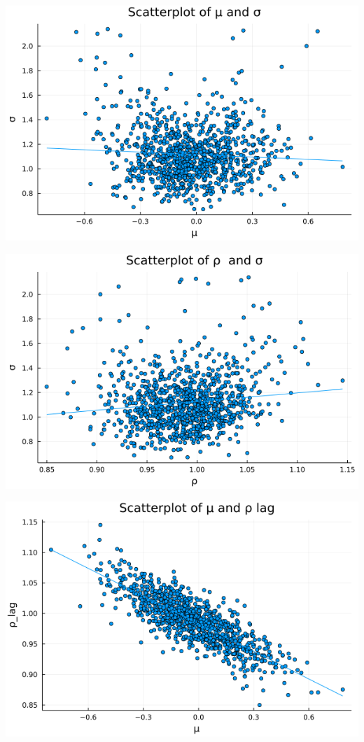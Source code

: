 \documentclass{article}
\begin{document}
\begin{enumerate}
\begin{center}
\includegraphics[scale=0.5]{p2_q3_mu_sigma.png}

\includegraphics[scale=0.5]{p2_q3_rho_sigma.png}

\includegraphics[scale=0.5]{p2_q3_mu_rho_lag.png}


\end{center}
\end{enumerate}
\end{document}
